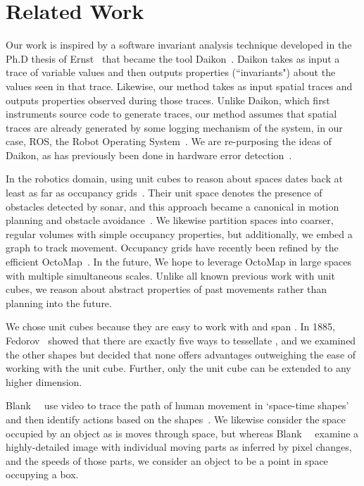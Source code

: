 \section{Related Work}
\label{sec:related}

Our work is inspired by a software invariant analysis technique developed in the Ph.D thesis of Ernst~\cite{ernst2000dynamically} that became the tool Daikon~\cite{ernst2007daikon}.
Daikon takes as input a trace of variable values and then outputs properties (``invariants") about the values seen in that trace.
Likewise, our method takes as input spatial traces and outputs properties observed during those traces.
Unlike Daikon, which first instruments source code to generate traces, our method assumes that spatial traces are already generated by some logging mechanism of the system, in our case, ROS, the Robot Operating System~\cite{quigley2009ros}.
We are re-purposing the ideas of Daikon, as has previously been done in hardware error detection~\cite{sahoo2008using}.

In the robotics domain, using unit cubes to reason about spaces dates back at least as far as occupancy grids~\cite{moravec1985high}.
Their unit space denotes the presence of obstacles detected by sonar, and this approach became a canonical in motion planning and obstacle avoidance~\cite{elfes1989using,borenstein1989real,siegwart2011introduction}.
We likewise partition spaces into coarser, regular volumes with simple occupancy properties, but additionally, we embed a graph to track movement.
Occupancy grids have recently been refined by the efficient OctoMap~\cite{wurm2010octomap}.
In the future, We hope to leverage OctoMap in large spaces with multiple simultaneous scales.
Unlike all known previous work with unit cubes, we reason about abstract properties of past movements rather than planning into the future.

We chose unit cubes because they are easy to work with and span \rthree. 
In 1885, Fedorov~\cite{fedorov1885elements} showed that there are exactly five ways to tessellate \rthree, and we examined the other shapes but decided that none offers advantages outweighing the ease of working with the unit cube.
Further, only the unit cube can be extended to any higher dimension.

Blank~\etal~ use video to trace the path of human movement in `space-time shapes' and then identify actions based on the shapes~\cite{blank2005actions}.
We likewise consider the space occupied by an object as is moves through space, but whereas Blank~\etal~ examine a highly-detailed image with individual moving parts as inferred by pixel changes, and the speeds of those parts, we consider an object to be a point in space occupying a box.

